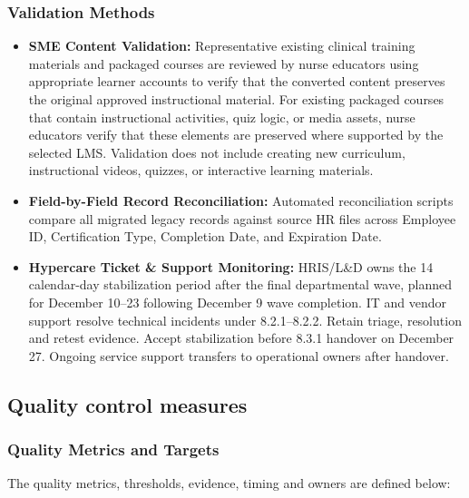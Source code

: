 \subsubsection{Validation Methods}\label{sec:validation-methods}
\begin{itemize}
\item \textbf{SME Content Validation:} Representative existing clinical training materials and packaged courses are reviewed by nurse educators using appropriate learner accounts to verify that the converted content preserves the original approved instructional material. For existing packaged courses that contain instructional activities, quiz logic, or media assets, nurse educators verify that these elements are preserved where supported by the selected LMS. Validation does not include creating new curriculum, instructional videos, quizzes, or interactive learning materials.
\item \textbf{Field-by-Field Record Reconciliation:} Automated reconciliation scripts compare all migrated legacy records against source HR files across Employee ID, Certification Type, Completion Date, and Expiration Date.
\item \textbf{Hypercare Ticket \& Support Monitoring:} HRIS/\allowbreak{}L\&D owns the 14 calendar-day stabilization period after the final departmental wave, planned for December 10--23 following December 9 wave completion. IT and vendor support resolve technical incidents under 8.2.1--8.2.2. Retain triage, resolution and retest evidence. Accept stabilization before 8.3.1 handover on December 27. Ongoing service support transfers to operational owners after handover.
\end{itemize}


\clearpage
\subsection{Quality control measures}\label{sec:6.3}
\subsubsection{Quality Metrics and Targets}\label{sec:quality-metrics-and-targets}
The quality metrics, thresholds, evidence, timing and owners are defined below:


